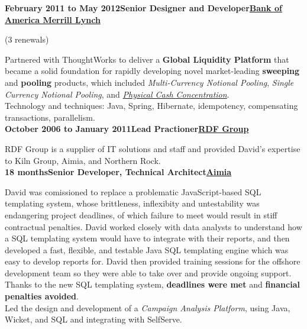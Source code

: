 \documentclass[a4paper,12pt]{article}
\newcommand{\clientwork}[3]{\textbf{#1\hfill#3\hfill#2}\nopagebreak}
\newcommand{\renewals}[2]{(#2)\nopagebreak}
\begin{document}
\clientwork{February 2011 to May 2012}{\href{http://corp.bankofamerica.com/}{Bank of America Merrill Lynch}}{Senior Designer and Developer}

\renewals{15 months}{3 renewals}


Partnered with ThoughtWorks to deliver a \textbf{Global Liquidity Platform} that became a solid foundation for rapidly developing novel market-leading \textbf{sweeping} and \textbf{pooling} products, which included \emph{Multi-Currency Notional Pooling}, \emph{Single Currency Notional Pooling}, and \emph{\href{http://www.marketwatch.com/story/bank-of-america-merrill-lynch-adds-physical-cash-concentration-to-global-liquidity-platform-2012-03-19}{Physical Cash Concentration}}.\\

Technology and techniques: Java, Spring, Hibernate, idempotency, compensating transactions, parallelism.\\

\clientwork{October 2006 to January 2011}{\href{http://www.rdfgroup.com/}{RDF Group}}{Lead Practioner}

RDF Group is a supplier of IT solutions and staff and provided David's expertise to Kiln Group, Aimia, and Northern Rock.\\

\clientwork{18 months}{\href{http://www.aimia.com/}{Aimia}}{Senior Developer, Technical Architect}

David was comissioned to replace a problematic JavaScript-based SQL templating system, whose brittleness, inflexibity and untestability was endangering project deadlines, of which failure to meet would result in stiff contractual penalties. David worked closely with data analysts to understand how a SQL templating system would have to integrate with their reports, and then developed a fast, flexible, and testable Java SQL templating engine which was easy to develop reports for. David then provided training sessions for the offshore development team so they were able to take over and provide ongoing support. Thanks to the new SQL templating system, \textbf{deadlines were met} and \textbf{financial penalties avoided}. \\

Led the design and development of a \emph{Campaign Analysis Platform}, using Java, Wicket, and SQL and integrating with SelfServe.\\
\end{document}

